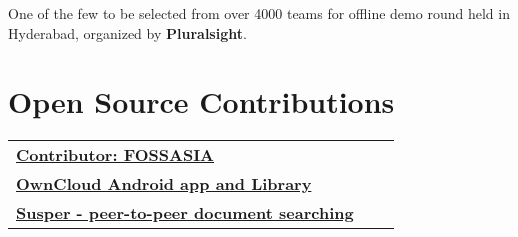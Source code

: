\documentclass[a4paper]{deedy-resume} %
\begin{document}
\begin{minipage}[t]{0.66\textwidth}
\sectionspace %



One of the few to be selected from over 4000 teams for offline demo round held in Hyderabad, organized by \href{https://www.pluralsight.com/}\textbf{}{\bf Pluralsight}.

\sectionspace %


\section{Open Source Contributions} 

\begin{tabular}{lll}
\href{https://github.com/fossasia}{\bf Contributor: FOSSASIA}\\
\href{https://github.com/GurpreetSK95/android}{\bf OwnCloud Android app and Library}\\
\href{https://github.com/GurpreetSK95/susper}{\bf Susper - peer-to-peer document searching}\\
\end{tabular}

\sectionspace %


\end{minipage} %








\end{document}
